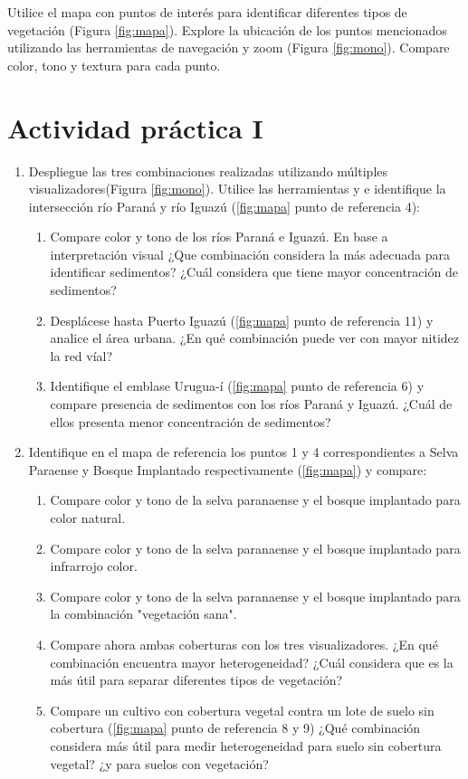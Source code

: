 Utilice el mapa con puntos de interés para identificar diferentes tipos de vegetación (Figura \ref{fig:mapa}). Explore la ubicación de los puntos mencionados utilizando las herramientas de navegación y zoom  (Figura \ref{fig:mono}). Compare color, tono y textura para cada punto.

\section{Actividad práctica I}

\begin{enumerate}
  \item Despliegue las tres combinaciones realizadas utilizando múltiples visualizadores(Figura \ref{fig:mono}). Utilice las herramientas  y  e identifique la intersección río Paraná y río Iguazú (\ref{fig:mapa} punto de referencia 4):
  \begin{enumerate}
    \item Compare color y tono de los ríos Paraná e Iguazú. En base a interpretación visual ¿Que combinación considera la más adecuada para identificar sedimentos? ¿Cuál  considera que tiene mayor concentración de sedimentos? 
        \item  Desplácese hasta Puerto Iguazú (\ref{fig:mapa} punto de referencia 11) y analice el área urbana. ¿En qué combinación puede ver con mayor nitidez la red víal? 
          \item  Identifique el emblase Urugua-í (\ref{fig:mapa} punto de referencia 6) y compare presencia de sedimentos con los ríos Paraná y Iguazú. ¿Cuál de ellos presenta menor concentración de sedimentos? 

  \end{enumerate}

  \item Identifique en el mapa de referencia los puntos                       1 y 4 correspondientes a Selva Paraense y Bosque Implantado respectivamente (\ref{fig:mapa}) y compare:
  \begin{enumerate}
    \item  Compare color y tono de la selva paranaense y el bosque implantado para color natural.
     \item  Compare color y tono de la selva paranaense y el bosque implantado para infrarrojo color.
      \item  Compare color y tono de la selva paranaense y el bosque implantado para la combinación "vegetación sana".
    \item Compare ahora ambas coberturas con los tres visualizadores. ¿En qué combinación encuentra mayor heterogeneidad? ¿Cuál considera que es la más útil para separar diferentes tipos de vegetación?
     \item Compare un cultivo con cobertura vegetal contra un lote de suelo sin cobertura (\ref{fig:mapa} punto de referencia 8 y 9) ¿Qué combinación considera más útil para medir heterogeneidad para suelo sin cobertura vegetal? ¿y para suelos con vegetación?
  \end{enumerate}


\end{enumerate}
